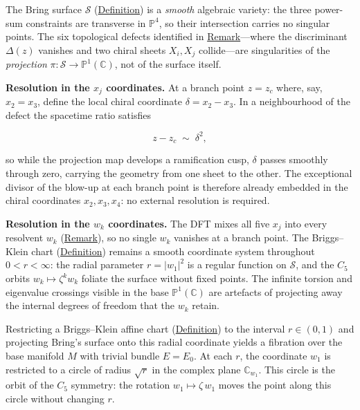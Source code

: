\begin{remark}
  \label{rem:brings-smoothness}
The Bring surface $\mathcal{S}$ (\hyperref[def:brings-surface]{Definition}) is a
\emph{smooth} algebraic variety: the three power-sum constraints are
transverse in $\mathbb{P}^4$, so their intersection carries no singular
points.  The six topological defects identified in
\hyperref[rem:chiral-bundles]{Remark}---where the discriminant $\Delta(z)$
vanishes and two chiral sheets $X_i,X_j$ collide---are singularities of
the \emph{projection} $\pi\colon\mathcal{S}\to\mathbb{P}^1(\mathbb{C})$, not of the
surface itself.

\textbf{Resolution in the $x_j$ coordinates.}
At a branch point $z=z_c$ where, say, $x_2=x_3$, define the local chiral
coordinate $\delta=x_2-x_3$.  In a neighbourhood of the defect the
spacetime ratio satisfies

\[
z-z_c\;\sim\;\delta^2,
\]

so while the projection map develops a ramification cusp, $\delta$ passes
smoothly through zero, carrying the geometry from one sheet to the other.
The exceptional divisor of the blow-up at each branch point is therefore
already embedded in the chiral coordinates $x_2,x_3,x_4$: no external
resolution is required.

\textbf{Resolution in the $w_k$ coordinates.}
The DFT mixes all five $x_j$ into every resolvent $w_k$
(\hyperref[rem:lagrange-resolvents]{Remark}), so no single $w_k$ vanishes at a
branch point.  The Briggs--Klein chart
(\hyperref[def:briggs-klein-chart]{Definition}) remains a smooth coordinate
system throughout $0<r<\infty$: the radial parameter $r=\lvert w_1\rvert^2$
is a regular function on $\mathcal{S}$, and the $C_5$ orbits
$w_k\mapsto\zeta^k w_k$ foliate the surface without fixed points.  The
infinite torsion and eigenvalue crossings visible in the base
$\mathbb{P}^1(\mathbb{C})$ are artefacts of projecting away the internal degrees of
freedom that the $w_k$ retain.
\end{remark}

\begin{remark}
  \label{rem:radial-projection}
Restricting a Briggs--Klein affine chart
(\hyperref[def:briggs-klein-chart]{Definition}) to the interval $r\in(0,1)$ and
projecting Bring's surface onto this radial coordinate yields a fibration
over the base manifold $M$ with trivial bundle $E=E_0$.  At each
$r$, the coordinate $w_1$ is restricted to a circle of radius $\sqrt{r}$ in
the complex plane $\mathbb{C}_{w_1}$.  This circle is the orbit of the $C_5$
symmetry: the rotation $w_1\mapsto\zeta\,w_1$ moves the point along this
circle without changing $r$.
\end{remark}

